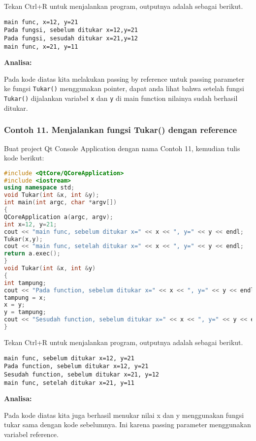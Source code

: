 Tekan Ctrl+R untuk menjalankan program, outputnya adalah sebagai
berikut.

\begin{verbatim}
main func, x=12, y=21
Pada fungsi, sebelum ditukar x=12,y=21
Pada fungsi, sesudah ditukar x=21,y=12
main func, x=21, y=11
\end{verbatim}

\textbf{Analisa:}

Pada kode diatas kita melakukan passing by reference untuk passing
parameter ke fungsi \texttt{Tukar()} menggunakan pointer, dapat anda
lihat bahwa setelah fungsi \texttt{Tukar()} dijalankan variabel
\texttt{x} dan \texttt{y} di main function nilainya sudah berhasil
ditukar.

\subsubsection*{Contoh 11. Menjalankan fungsi Tukar() dengan reference}

Buat project Qt Console Application dengan nama Contoh 11, kemudian
tulis kode berikut:

\begin{lstlisting}[language=c++]
#include <QtCore/QCoreApplication>
#include <iostream>
using namespace std;
void Tukar(int &x, int &y);
int main(int argc, char *argv[])
{
QCoreApplication a(argc, argv);
int x=12, y=21;
cout << "main func, sebelum ditukar x=" << x << ", y=" << y << endl;
Tukar(x,y);
cout << "main func, setelah ditukar x=" << x << ", y=" << y << endl;
return a.exec();
}
void Tukar(int &x, int &y)
{
int tampung;
cout << "Pada function, sebelum ditukar x=" << x << ", y=" << y << endl;
tampung = x;
x = y;
y = tampung;
cout << "Sesudah function, sebelum ditukar x=" << x << ", y=" << y << endl;
}
\end{lstlisting}

Tekan Ctrl+R untuk menjalankan program, outputnya adalah sebagai
berikut.

\begin{verbatim}
main func, sebelum ditukar x=12, y=21
Pada function, sebelum ditukar x=12, y=21
Sesudah function, sebelum ditukar x=21, y=12
main func, setelah ditukar x=21, y=11
\end{verbatim}

\textbf{Analisa:}

Pada kode diatas kita juga berhasil menukar nilai x dan y menggunakan
fungsi tukar sama dengan kode sebelumnya. Ini karena passing parameter
menggunakan variabel reference.

